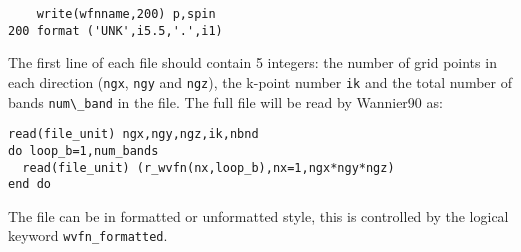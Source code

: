 \begin{verbatim}
    write(wfnname,200) p,spin
200 format ('UNK',i5.5,'.',i1)
\end{verbatim}

The first line of each file should contain 5 integers: the number of
 grid points in each direction (\verb#ngx#, \verb#ngy# and
 \verb#ngz#), the k-point number \verb#ik# and the total number of
 bands \verb#num\_band# in the file. The full file will be read by Wannier90 as:

\begin{verbatim}
read(file_unit) ngx,ngy,ngz,ik,nbnd
do loop_b=1,num_bands
  read(file_unit) (r_wvfn(nx,loop_b),nx=1,ngx*ngy*ngz)
end do
\end{verbatim}

The file can be in formatted or unformatted style, this is controlled
by the logical keyword \verb#wvfn_formatted#. 



